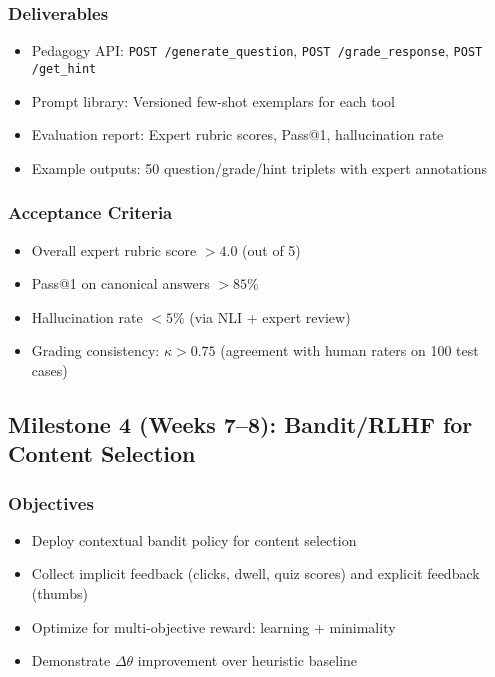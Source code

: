 \documentclass[11pt,letterpaper]{article}
\begin{document}
\subsubsection{Deliverables}
\begin{itemize}
\item Pedagogy API: \texttt{POST /generate\_question}, \texttt{POST /grade\_response}, \texttt{POST /get\_hint}
\item Prompt library: Versioned few-shot exemplars for each tool
\item Evaluation report: Expert rubric scores, Pass@1, hallucination rate
\item Example outputs: 50 question/grade/hint triplets with expert annotations
\end{itemize}

\subsubsection{Acceptance Criteria}
\begin{itemize}
\item Overall expert rubric score $> 4.0$ (out of 5)
\item Pass@1 on canonical answers $> 85\%$
\item Hallucination rate $< 5\%$ (via NLI + expert review)
\item Grading consistency: $\kappa > 0.75$ (agreement with human raters on 100 test cases)
\end{itemize}

\subsection{Milestone 4 (Weeks 7--8): Bandit/RLHF for Content Selection}

\subsubsection{Objectives}
\begin{itemize}
\item Deploy contextual bandit policy for content selection
\item Collect implicit feedback (clicks, dwell, quiz scores) and explicit feedback (thumbs)
\item Optimize for multi-objective reward: learning + minimality
\item Demonstrate $\Delta\theta$ improvement over heuristic baseline
\end{itemize}
\end{document}
